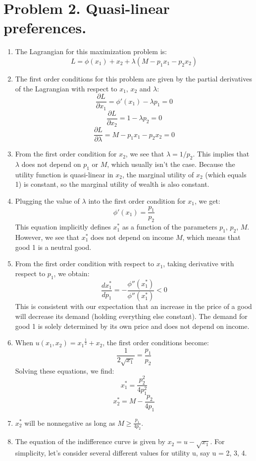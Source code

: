 \documentclass[UTF8,titlepage]{article}
\numberwithin{figure}{section}
\begin{document}
\section{Problem 2. Quasi-linear preferences.}
\begin{enumerate}
  \item The Lagrangian for this maximization problem is:
  \[L = \phi(x_1) + x_2 + \lambda(M - p_1x_1 - p_2x_2)\]
  \item The first order conditions for this problem are given by the partial derivatives of the Lagrangian with respect to $x_1$, $x_2$ and $\lambda$:
  \[\frac{\partial L}{\partial x_1} = \phi'(x_1) - \lambda p_1 = 0\]
  \[\frac{\partial L}{\partial x_2} = 1 - \lambda p_2 = 0\]
  \[\frac{\partial L}{\partial \lambda} = M - p_1 x_1 - p_2 x_2 = 0\]
  \item From the first order condition for $x_2$, we see that $\lambda = 1/p_2$. This implies that $\lambda$ does not depend on $p_1$ or $M$, which usually isn't the case. Because the utility function is quasi-linear in $x_2$, the marginal utility of $x_2$ (which equals 1) is constant, so the marginal utility of wealth is also constant.
  \item Plugging the value of $\lambda$ into the first order condition for $x_1$, we get:
  \[\phi'(x_1) = \frac{p_1}{p_2}\]
  This equation implicitly defines $x_1^*$ as a function of the parameters $p_1$, $p_2$, $M$. However, we see that $x_1^*$ does not depend on income $M$, which means that good 1 is a neutral good.
  \item From the first order condition with respect to $x_1$, taking derivative with respect to $p_1$, we obtain:
  \[\frac{d x_1^*}{dp_1} = -\frac{\phi''(x_1^*)}{\phi''(x_1^*)} < 0\]
  This is consistent with our expectation that an increase in the price of a good will decrease its demand (holding everything else constant). The demand for good 1 is solely determined by its own price and does not depend on income.
  \item When $u(x_1, x_2) = {x_1}^{\frac{1}{2}} + x_2$, the first order conditions become:
  \[\frac{1}{2\sqrt{x_1}} = \frac{p_1}{p_2}\]
  Solving these equations, we find:
  \[x_1^* = \frac{p_2^2}{4 p_1^2}\]
  \[x_2^* = M - \frac{p_2}{4 p_1}\]
  \item $x_2^*$ will be nonnegative as long as $M \geq \frac{p_1}{4 p_2}$.
  \item The equation of the indifference curve is given by $x_2 = u - \sqrt{x_1}$. For simplicity, let's consider several different values for utility u, say u = 2, 3, 4.
  

\end{enumerate}
\end{document}
